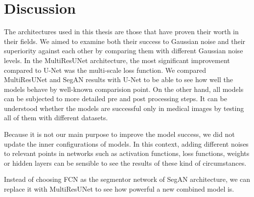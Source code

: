 \chapter{Discussion}

    The architectures used in this thesis are those that have proven their worth in their fields.
    We aimed to examine both their success to Gaussian noise and their superiority against each other by comparing them with different Gaussian noise levels.
    In the MultiResUNet architecture, the most significant improvement compared to U-Net was the multi-scale loss function.
    We compared MultiResUNet and SegAN results with U-Net to be able to see how well the models behave by well-known comparision point.
    On the other hand, all models can be subjected to more detailed pre and post processing steps.
    It can be understood whether the models are successful only in medical images by testing all of them with different datasets.

    Because it is not our main purpose to improve the model success, we did not update the inner configurations of models.
    In this context, adding different noises to relevant points in networks such as activation functions,
    loss functions, weights or hidden layers can be sensible to see the results of these kind of circumstances.

    Instead of choosing FCN as the segmentor network of SegAN architecture, we can replace it with MultiResUNet to see how powerful a new combined model is.